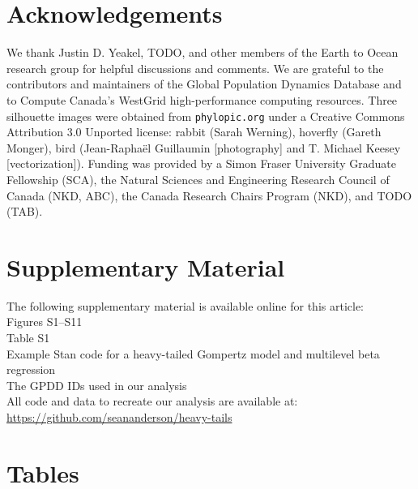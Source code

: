 \section{Acknowledgements}

We thank Justin D. Yeakel, TODO, and other members of the Earth to Ocean
research group for helpful discussions and comments. We are grateful to the
contributors and maintainers of the Global Population Dynamics Database and to
Compute Canada's WestGrid high-performance computing resources. Three
silhouette images were obtained from \texttt{phylopic.org} under a Creative
Commons Attribution 3.0 Unported license: rabbit (Sarah Werning), hoverfly
(Gareth Monger), bird (Jean-Raphaël Guillaumin {[}photography{]} and T. Michael
Keesey {[}vectorization{]}). Funding was provided by a Simon Fraser University
Graduate Fellowship (SCA), the Natural Sciences and Engineering Research
Council of Canada (NKD, ABC), the Canada Research Chairs Program (NKD), and
TODO (TAB).

\section{Supplementary Material}

The following supplementary material is available online for this article:\\
Figures S1--S11\\
Table S1\\
Example Stan code for a heavy-tailed Gompertz model and multilevel beta
regression\\
The GPDD IDs used in our analysis\\
All code and data to recreate our analysis are available at:\\
\url{https://github.com/seananderson/heavy-tails}




\clearpage

\section{Tables}



